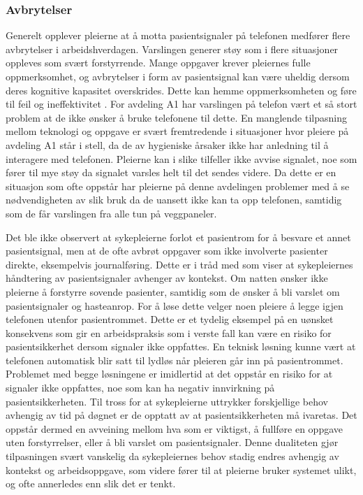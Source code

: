 \subsubsection{Avbrytelser}
Generelt opplever pleierne at å motta pasientsignaler på telefonen medfører flere avbrytelser i arbeidshverdagen. Varslingen generer støy som i flere situasjoner oppleves som svært forstyrrende. Mange oppgaver krever pleiernes fulle oppmerksomhet, og avbrytelser i form av pasientsignal kan være uheldig dersom deres kognitive kapasitet overskrides. Dette kan hemme oppmerksomheten og føre til feil og ineffektivitet \citep{Ebright10, Parker00}. For avdeling A1 har varslingen på telefon vært et så stort problem at de ikke ønsker å bruke telefonene til dette. En manglende tilpasning mellom teknologi og oppgave er svært fremtredende i situasjoner hvor pleiere på avdeling A1 står i stell, da de av hygieniske årsaker ikke har anledning til å interagere med telefonen. Pleierne kan i slike tilfeller ikke avvise signalet, noe som fører til mye støy da signalet varsles helt til det sendes videre. Da dette er en situasjon som ofte oppstår har pleierne på denne avdelingen problemer med å se nødvendigheten av slik bruk da de uansett ikke kan ta opp telefonen, samtidig som de får varslingen fra alle tun på veggpaneler.

\noindent
Det ble ikke observert at sykepleierne forlot et pasientrom for å besvare et annet pasientsignal, men at de ofte avbrøt oppgaver som ikke involverte pasienter direkte, eksempelvis journalføring. Dette er i tråd med \citet{klemets13} som viser at sykepleiernes håndtering av pasientsignaler avhenger av kontekst. Om natten ønsker ikke pleierne å forstyrre sovende pasienter, samtidig som de ønsker å bli varslet om pasientsignaler og hasteanrop. For å løse dette velger noen pleiere å legge igjen telefonen utenfor pasientrommet. Dette er et tydelig eksempel på en uønsket konsekvens som gir en arbeidspraksis som i verste fall kan være en risiko for pasientsikkerhet dersom signaler ikke oppfattes. En teknisk løsning kunne vært at telefonen automatisk blir satt til lydløs når pleieren går inn på pasientrommet. Problemet med begge løsningene er imidlertid at det oppstår en risiko for at signaler ikke oppfattes, noe som kan ha negativ innvirkning på pasientsikkerheten. Til tross for at sykepleierne uttrykker forskjellige behov avhengig av tid på døgnet er de opptatt av at pasientsikkerheten må ivaretas. Det oppstår dermed en avveining mellom hva som er viktigst, å fullføre en oppgave uten forstyrrelser, eller å bli varslet om pasientsignaler. Denne dualiteten gjør tilpasningen svært vanskelig da sykepleiernes behov stadig endres avhengig av kontekst og arbeidsoppgave, som videre fører til at pleierne bruker systemet ulikt, og ofte annerledes enn slik det er tenkt. 

